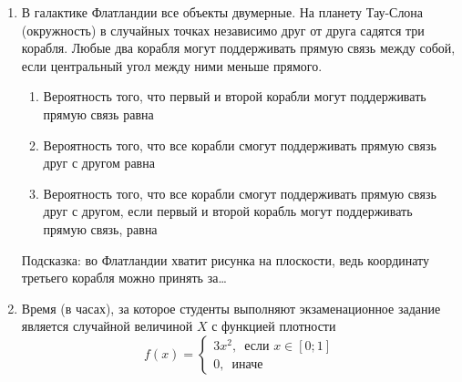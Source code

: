 \documentclass[12pt, a4paper]{article}\usepackage[]{graphicx}\usepackage[]{color}
\begin{document}
\begin{enumerate}

\item В галактике Флатландии все объекты двумерные. На планету Тау-Слона (окружность) в случайных точках независимо друг от друга садятся три корабля. Любые два корабля могут поддерживать прямую связь между собой, если центральный угол между ними меньше прямого.

\begin{enumerate}
\item Вероятность того, что первый и второй корабли могут поддерживать прямую связь равна \underline{\hspace{2cm}}
\item Вероятность того, что все корабли смогут поддерживать прямую связь друг с другом равна \underline{\hspace{2cm}}
\item Вероятность того, что все корабли смогут поддерживать прямую связь друг с другом, если первый и второй корабль могут поддерживать прямую связь, равна \underline{\hspace{2cm}}
\end{enumerate}
Подсказка: во Флатландии хватит рисунка на плоскости, ведь координату третьего корабля можно принять за\ldots



\item Время (в часах), за которое студенты выполняют экзаменационное задание является случайной величиной $X$ с функцией плотности
\[
f(x)=\begin{cases}
3x^2, \, \text{ если } x \in [0;1] \\
0, \, \text{ иначе }
\end{cases}
\]


\end{enumerate}
\end{document}
